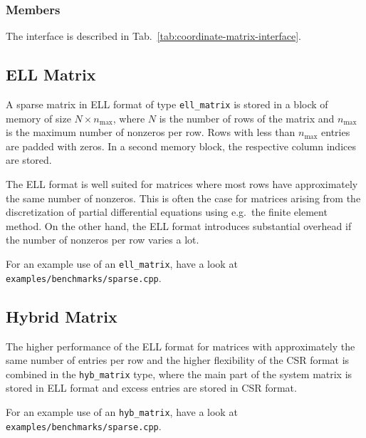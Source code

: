 \subsubsection{Members}
The interface is described in Tab.~\ref{tab:coordinate-matrix-interface}. 



\subsection{ELL Matrix}
A sparse matrix in ELL format of type \lstinline|ell_matrix| is stored in a block of memory of size $N \times n_{\max}$, where $N$ is the number of rows of the matrix and $n_{\max}$ is the maximum number of nonzeros per row.
Rows with less than $n_{\max}$ entries are padded with zeros. In a second memory block, the respective column indices are stored.

The ELL format is well suited for matrices where most rows have approximately the same number of nonzeros.
This is often the case for matrices arising from the discretization of partial differential equations using e.g.~the finite element method.
On the other hand, the ELL format introduces substantial overhead if the number of nonzeros per row varies a lot.

For an example use of an \lstinline|ell_matrix|, have a look at \lstinline|examples/benchmarks/sparse.cpp|.


\subsection{Hybrid Matrix}
The higher performance of the ELL format for matrices with approximately the same number of entries per row
and the higher flexibility of the CSR format is combined in the \lstinline|hyb_matrix| type, where the main part of the system matrix is stored in ELL format and excess entries are stored in CSR format.

For an example use of an \lstinline|hyb_matrix|, have a look at \lstinline|examples/benchmarks/sparse.cpp|.


